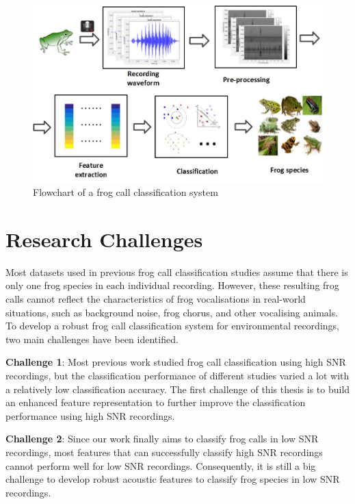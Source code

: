 \begin{figure}[htb!]
\centering
\includegraphics[width=\textwidth]{image/Ch1/flowchart.jpg}
\caption[Flowchart of a frog call classification system]{Flowchart of a frog call classification system}
\label{fig:Ch1_flowchart}
\end{figure}


\section{Research Challenges}
Most datasets used in previous frog call classification studies assume that there is only one frog species in each individual recording. However, these resulting frog calls cannot reflect the characteristics of frog vocalisations in real-world situations, such as background noise, frog chorus, and other vocalising animals. To develop a robust frog call classification system for environmental recordings, two main challenges have been identified. 


\noindent \textbf{Challenge 1}: Most previous work studied frog call classification using high SNR recordings, but the classification performance of different studies varied a lot with a relatively low classification accuracy. The first challenge of this thesis is to build an enhanced feature representation to further improve the classification performance using high SNR recordings. 

\noindent \textbf{Challenge 2}: Since our work finally aims to classify frog calls in low SNR recordings, most features that can successfully classify high SNR recordings cannot perform well for low SNR recordings. Consequently, it is still a big challenge to develop robust acoustic features to classify frog species in low SNR recordings. 

